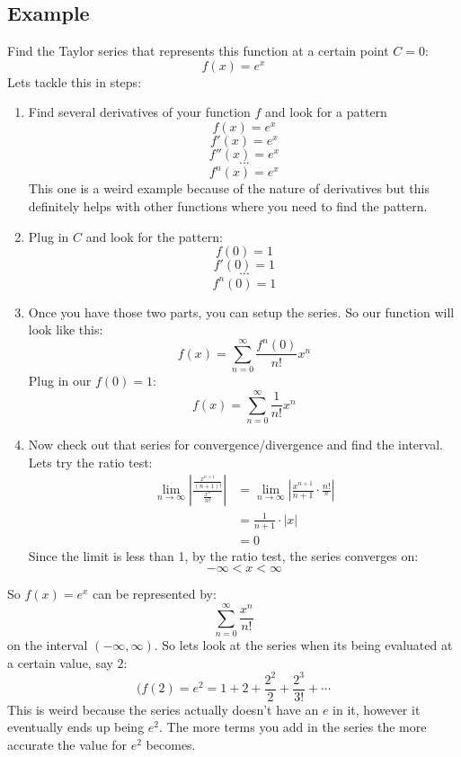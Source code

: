 \documentclass{report}
\begin{document}
    \subsection{Example}
        Find the Taylor series that represents this function at a certain point \(C = 0\):
        \[f(x) = e^x\]
        Lets tackle this in steps:
        \begin{enumerate}
            \item Find several derivatives of your function \(f\) and look for a pattern
            \[f(x) = e^x\]
            \[f'(x) = e^x\]
            \[f''(x) = e^x\]
            \[\cdots\]
            \[f^n(x) = e^x\]
            This one is a weird example because of the nature of derivatives but this definitely helps with other functions where you need to find the pattern.
            \item Plug in \(C\) and look for the pattern:
            \[f(0) = 1\]
            \[f'(0) = 1\]
            \[\cdots\]
            \[f^n(0) = 1\]
            \item Once you have those two parts, you can setup the series.
            So our function will look like this:
            \[f(x) = \sum_{n=0}^{\infty} \frac{f^n(0)}{n!}x^n\]
            Plug in our \(f(0) = 1\):
            \[f(x) = \sum_{n=0}^{\infty} \frac{1}{n!}x^n\]
            \item Now check out that series for convergence/divergence and find the interval.
            Lets try the ratio test:
            \begin{align*}
                \lim_{n \to \infty} \left| \frac{\frac{x^{n+1}}{(n+1)!}}{\frac{x^n}{n!}} \right|
                &= \lim_{n \to \infty} \left| \frac{x^{n+1}}{n+1} \cdot \frac{n!}{^n} \right| \\
                &= \frac{1}{n+1} \cdot |x| \\
                &= 0
            \end{align*}
            Since the limit is less than 1, by the ratio test, the series converges on:
            \[- \infty < x < \infty\]
        \end{enumerate}
        So \(f(x) = e^x \) can be represented by:
        \[\sum_{n = 0}^{\infty} \frac{x^n}{n!}\]
        on the interval \((- \infty, \infty)\).
        So lets look at the series when its being evaluated at a certain value, say \(2\):
        \[(f(2) = e^2 = 1 + 2 + \frac{2^2}{2} + \frac{2^3}{3!} + \cdots\]      
        This is weird because the series actually doesn't have an \(e\) in it, however it eventually ends up being \(e^2\).
        The more terms you add in the series the more accurate the value for \(e^2\) becomes.
    
\end{document}
